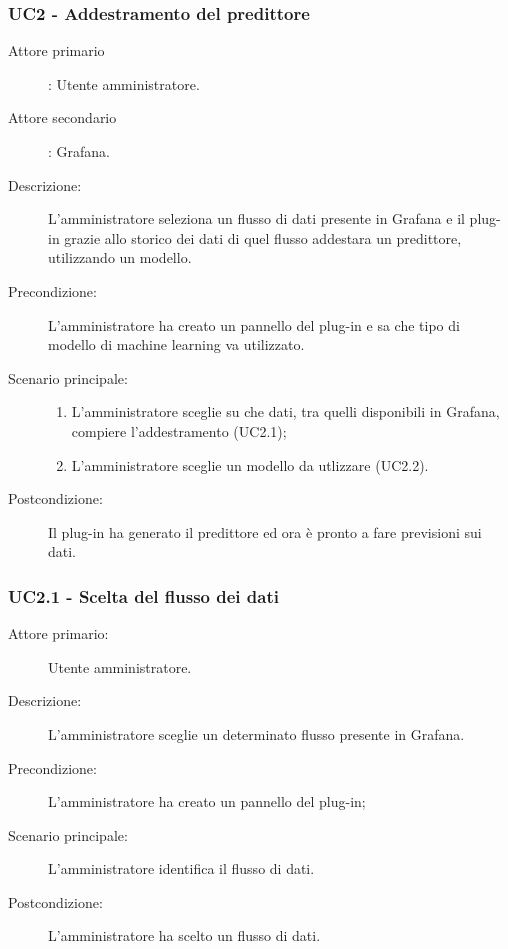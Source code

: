 \subsubsection{UC2 - Addestramento del predittore}
\label{sssec:uc2}
\begin{description}
  \item[Attore primario]: Utente amministratore.
  \item[Attore secondario]: Grafana.
  \item[Descrizione:] L'amministratore seleziona un flusso di dati presente in Grafana e il plug-in grazie allo storico dei dati di quel flusso addestara un predittore, utilizzando un modello.
  \item[Precondizione:] L'amministratore ha creato un pannello del plug-in e sa che tipo di modello di machine learning va utilizzato.
  \item[Scenario principale:]
  \begin{enumerate}
    \item L'amministratore sceglie su che dati, tra quelli disponibili in Grafana, compiere l'addestramento (UC2.1);
    \item L'amministratore sceglie un modello da utlizzare (UC2.2).
  \end{enumerate}
  \item[Postcondizione:] Il plug-in ha generato il predittore ed ora è pronto a fare previsioni sui dati.
\end{description}

\subsubsection{UC2.1 - Scelta del flusso dei dati}
\label{sssec:uc2.1}
\begin{description}
  \item[Attore primario:] Utente amministratore.
  \item[Descrizione:] L'amministratore sceglie un determinato flusso presente in Grafana.
  \item[Precondizione:] L'amministratore ha creato un pannello del plug-in;
  \item[Scenario principale:] L'amministratore identifica il flusso di dati.
  \item[Postcondizione:] L'amministratore ha scelto un flusso di dati.
\end{description}

